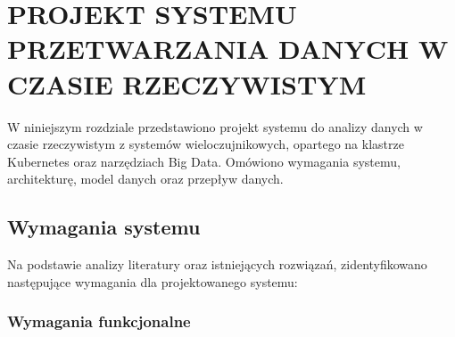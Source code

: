 \section{PROJEKT SYSTEMU PRZETWARZANIA DANYCH W CZASIE RZECZYWISTYM}
\label{sec:projekt_systemu}

W niniejszym rozdziale przedstawiono projekt systemu do analizy danych w czasie rzeczywistym z systemów wieloczujnikowych, opartego na klastrze Kubernetes oraz narzędziach Big Data. Omówiono wymagania systemu, architekturę, model danych oraz przepływ danych.

\subsection{Wymagania systemu}
\label{subsec:wymagania}

Na podstawie analizy literatury oraz istniejących rozwiązań, zidentyfikowano następujące wymagania dla projektowanego systemu:

\subsubsection{Wymagania funkcjonalne}
\label{subsubsec:wymagania_funkcjonalne}

